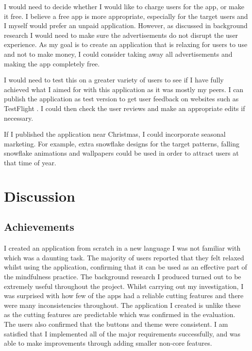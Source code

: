 \documentclass[11pt]{article}
\begin{document}
        I would need to decide whether I would like to charge users for the app, or make it free. I believe a free app is more appropriate, especially for the target users and I myself would prefer an unpaid application. However, as discussed in background research I would need to make sure the advertisements do not disrupt the user experience. As my goal is to create an application that is relaxing for users to use and not to make money, I could consider taking away all advertisements and making the app completely free.
        
        I would need to test this on a greater variety of users to see if I have fully achieved what I aimed for with this application as it was mostly my peers.  I can publish the application as test version to get user feedback on websites such as TestFlight \cite{TestFlight}.
        I could then check the user reviews and make an appropriate edits if necessary. 
        
        If I published the application near Christmas, I could incorporate seasonal marketing. For example, extra snowflake designs for the target patterns, falling snowflake animations and wallpapers could be used in order to attract users at that time of year.
        
\newpage
\section{Discussion}
    \subsection{Achievements}
        \paragraph{}
        I created an application from scratch in a new language I was not familiar with which was a daunting task. The majority of users reported that they felt relaxed whilst using the application, confirming that it can be used as an effective part of the mindfulness practice. The background research I produced turned out to be extremely useful throughout the project. Whilst carrying out my investigation, I was surprised with how few of the apps had a reliable cutting features and there were many inconsistencies throughout. The application I created is unlike these as the cutting features are predictable which was confirmed in the evaluation. The users also confirmed that the buttons and theme were consistent. I am satisfied that I implemented all of the major requirements successfully, and was able to make improvements through adding smaller non-core features.
        
\end{document}
